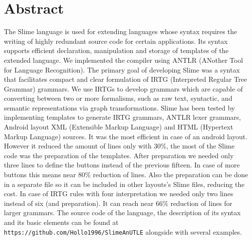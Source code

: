 \chapter*{Abstract}

The Slime language is used for extending languages whose syntax requires the writing of highly redundant source code for certain applications. 
Its syntax supports efficient declaration, manipulation and storage of templates of the extended language. 
We implemented the compiler using ANTLR (ANother Tool for Language Recognition). 
The primary goal of developing Slime was a syntax that facilitates compact and clear formulation of IRTG (Interpreted Regular Tree Grammar) grammars. 
We use IRTGs to develop grammars which are capable of converting between two or more formalisms, such as raw text, syntactic, and semantic representations via graph transformations. 
Slime has been tested by implementing templates to generate IRTG grammars, ANTLR lexer grammars, Android layout XML (Extensible Markup Language) and HTML  (Hypertext Markup Language) sources.
It was the most efficient in case of an android layout.
However it reduced the amount of lines only with 30\%, the most of the Slime code was the preparation of the templates.
After preparation we needed only three lines to define the buttons instead of the previous fifteen.
In case of more buttons this means near 80\% reduction of lines.
Also the preparation can be done in a separate file so it can be included in other layouts's Slime files, reducing the cost.
In case of IRTG rules with four interpretation we needed only two lines instead of six (and preparation).
It can reach near 66\% reduction of lines for larger grammars.
The source code of the language, the description of its syntax and its basic elements can be found at \texttt{https://github.com/Hollo1996/SlimeAnUTLE} alongside with several examples.

\vfill
\selectthesislanguage

\setcounter{romanPage}{\value{page}}
